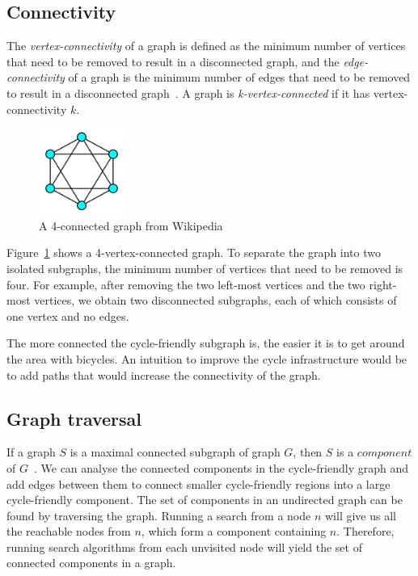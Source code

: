 \documentclass[12pt,a4paper]{report}
\begin{document}
\subsection{Connectivity}
The \textit{vertex-connectivity} of a graph is defined as the minimum number of vertices that need to be removed to result in a disconnected graph, and the \textit{edge-connectivity} of a graph is the minimum number of edges that need to be removed to result in a disconnected graph~\cite{buckley1990distance}. A graph is \textit{k-vertex-connected} if it has vertex-connectivity $k$.

\begin{figure}[ht]
    \centering
    \includegraphics[width=0.25\textwidth]{diss_images/context/connectivity.png}
    \caption{A 4-connected graph from Wikipedia~\cite{WikipediaEN:Connectivity}}
    \label{fig:connectivity4}
\end{figure}

Figure~\ref{fig:connectivity4} shows a 4-vertex-connected graph. To separate the graph into two isolated subgraphs, the minimum number of vertices that need to be removed is four. For example, after removing the two left-most vertices and the two right-most vertices, we obtain two disconnected subgraphs, each of which consists of one vertex and no edges. 

The more connected the cycle-friendly subgraph is, the easier it is to get around the area with bicycles. An intuition to improve the cycle infrastructure would be to add paths that would increase the connectivity of the graph.

\subsection{Graph traversal}
If a graph $S$ is a maximal connected subgraph of graph $G$, then $S$ is a $component$ of $G$~\cite{citeulike:395714}. We can analyse the connected components in the cycle-friendly graph and add edges between them to connect smaller cycle-friendly regions into a large cycle-friendly component. The set of components in an undirected graph can be found by traversing the graph. Running a search from a node $n$ will give us all the reachable nodes from $n$, which form a component containing $n$. Therefore, running search algorithms from each unvisited node will yield the set of connected components in a graph.
\end{document}

